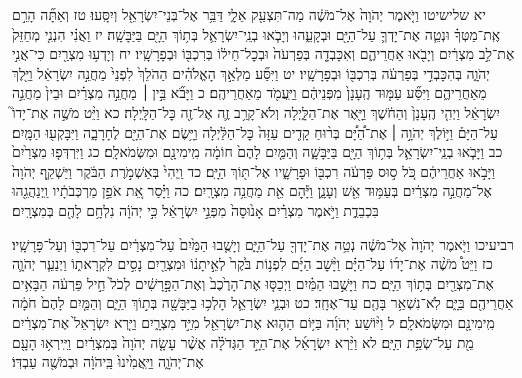 \documentclass[twoside, openany, parskip=half, 11pt]{book}
\begin{document}
יא שלישיטו וַיֹּ֤אמֶר יְהֹוָה֙ אֶל־מֹשֶׁ֔ה מַה־תִּצְעַ֖ק אֵלָ֑י דַּבֵּ֥ר אֶל־בְּנֵי־יִשְׂרָאֵ֖ל וְיִסָּֽעוּ׃ טז וְאַתָּ֞ה הָרֵ֣ם אֶֽת־מַטְּךָ֗ וּנְטֵ֧ה אֶת־יָדְךָ֛ עַל־הַיָּ֖ם וּבְקָעֵ֑הוּ וְיָבֹ֧אוּ בְנֵֽי־יִשְׂרָאֵ֛ל בְּת֥וֹךְ הַיָּ֖ם בַּיַּבָּשָֽׁה׃ יז וַאֲנִ֗י הִנְנִ֤י מְחַזֵּק֙ אֶת־לֵ֣ב מִצְרַ֔יִם וְיָבֹ֖אוּ אַחֲרֵיהֶ֑ם וְאִכָּבְדָ֤ה בְּפַרְעֹה֙ וּבְכׇל־חֵיל֔וֹ בְּרִכְבּ֖וֹ וּבְפָרָשָֽׁיו׃ יח וְיָדְע֥וּ מִצְרַ֖יִם כִּי־אֲנִ֣י יְהֹוָ֑ה בְּהִכָּבְדִ֣י בְּפַרְעֹ֔ה בְּרִכְבּ֖וֹ וּבְפָרָשָֽׁיו׃ יט וַיִּסַּ֞ע מַלְאַ֣ךְ הָאֱלֹהִ֗ים הַהֹלֵךְ֙ לִפְנֵי֙ מַחֲנֵ֣ה יִשְׂרָאֵ֔ל וַיֵּ֖לֶךְ מֵאַחֲרֵיהֶ֑ם וַיִּסַּ֞ע עַמּ֤וּד הֶֽעָנָן֙ מִפְּנֵיהֶ֔ם וַיַּֽעֲמֹ֖ד מֵאַחֲרֵיהֶֽם׃ כ וַיָּבֹ֞א בֵּ֣ין ׀ מַחֲנֵ֣ה מִצְרַ֗יִם וּבֵין֙ מַחֲנֵ֣ה יִשְׂרָאֵ֔ל וַיְהִ֤י הֶֽעָנָן֙ וְהַחֹ֔שֶׁךְ וַיָּ֖אֶר אֶת־הַלָּ֑יְלָה וְלֹא־קָרַ֥ב זֶ֛ה אֶל־זֶ֖ה כׇּל־הַלָּֽיְלָה׃ כא וַיֵּ֨ט מֹשֶׁ֣ה אֶת־יָדוֹ֮ עַל־הַיָּם֒ וַיּ֣וֹלֶךְ יְהֹוָ֣ה ׀ אֶת־הַ֠יָּ֠ם בְּר֨וּחַ קָדִ֤ים עַזָּה֙ כׇּל־הַלַּ֔יְלָה וַיָּ֥שֶׂם אֶת־הַיָּ֖ם לֶחָרָבָ֑ה וַיִּבָּקְע֖וּ הַמָּֽיִם׃ כב וַיָּבֹ֧אוּ בְנֵֽי־יִשְׂרָאֵ֛ל בְּת֥וֹךְ הַיָּ֖ם בַּיַּבָּשָׁ֑ה וְהַמַּ֤יִם לָהֶם֙ חוֹמָ֔ה מִֽימִינָ֖ם וּמִשְּׂמֹאלָֽם׃ כג וַיִּרְדְּפ֤וּ מִצְרַ֙יִם֙ וַיָּבֹ֣אוּ אַחֲרֵיהֶ֔ם כֹּ֚ל ס֣וּס פַּרְעֹ֔ה רִכְבּ֖וֹ וּפָרָשָׁ֑יו אֶל־תּ֖וֹךְ הַיָּֽם׃ כד וַֽיְהִי֙ בְּאַשְׁמֹ֣רֶת הַבֹּ֔קֶר וַיַּשְׁקֵ֤ף יְהֹוָה֙ אֶל־מַחֲנֵ֣ה מִצְרַ֔יִם בְּעַמּ֥וּד אֵ֖שׁ וְעָנָ֑ן וַיָּ֕הׇם אֵ֖ת מַחֲנֵ֥ה מִצְרָֽיִם׃ כה וַיָּ֗סַר אֵ֚ת אֹפַ֣ן מַרְכְּבֹתָ֔יו וַֽיְנַהֲגֵ֖הוּ בִּכְבֵדֻ֑ת וַיֹּ֣אמֶר מִצְרַ֗יִם אָנ֙וּסָה֙ מִפְּנֵ֣י יִשְׂרָאֵ֔ל כִּ֣י יְהֹוָ֔ה נִלְחָ֥ם לָהֶ֖ם בְּמִצְרָֽיִם׃

רביעיכו וַיֹּ֤אמֶר יְהֹוָה֙ אֶל־מֹשֶׁ֔ה נְטֵ֥ה אֶת־יָדְךָ֖ עַל־הַיָּ֑ם וְיָשֻׁ֤בוּ הַמַּ֙יִם֙ עַל־מִצְרַ֔יִם עַל־רִכְבּ֖וֹ וְעַל־פָּרָשָֽׁיו׃ כז וַיֵּט֩ מֹשֶׁ֨ה אֶת־יָד֜וֹ עַל־הַיָּ֗ם וַיָּ֨שׇׁב הַיָּ֜ם לִפְנ֥וֹת בֹּ֙קֶר֙ לְאֵ֣יתָנ֔וֹ וּמִצְרַ֖יִם נָסִ֣ים לִקְרָאת֑וֹ וַיְנַעֵ֧ר יְהֹוָ֛ה אֶת־מִצְרַ֖יִם בְּת֥וֹךְ הַיָּֽם׃ כח וַיָּשֻׁ֣בוּ הַמַּ֗יִם וַיְכַסּ֤וּ אֶת־הָרֶ֙כֶב֙ וְאֶת־הַפָּ֣רָשִׁ֔ים לְכֹל֙ חֵ֣יל פַּרְעֹ֔ה הַבָּאִ֥ים אַחֲרֵיהֶ֖ם בַּיָּ֑ם לֹֽא־נִשְׁאַ֥ר בָּהֶ֖ם עַד־אֶחָֽד׃ כט וּבְנֵ֧י יִשְׂרָאֵ֛ל הָלְכ֥וּ בַיַּבָּשָׁ֖ה בְּת֣וֹךְ הַיָּ֑ם וְהַמַּ֤יִם לָהֶם֙ חֹמָ֔ה מִֽימִינָ֖ם וּמִשְּׂמֹאלָֽם׃ ל וַיּ֨וֹשַׁע יְהֹוָ֜ה בַּיּ֥וֹם הַה֛וּא אֶת־יִשְׂרָאֵ֖ל מִיַּ֣ד מִצְרָ֑יִם וַיַּ֤רְא יִשְׂרָאֵל֙ אֶת־מִצְרַ֔יִם מֵ֖ת עַל־שְׂפַ֥ת הַיָּֽם׃ לא וַיַּ֨רְא יִשְׂרָאֵ֜ל אֶת־הַיָּ֣ד הַגְּדֹלָ֗ה אֲשֶׁ֨ר עָשָׂ֤ה יְהֹוָה֙ בְּמִצְרַ֔יִם וַיִּֽירְא֥וּ הָעָ֖ם אֶת־יְהֹוָ֑ה וַיַּֽאֲמִ֙ינוּ֙ בַּֽיהֹוָ֔ה וּבְמֹשֶׁ֖ה עַבְדּֽוֹ׃
\end{document}
